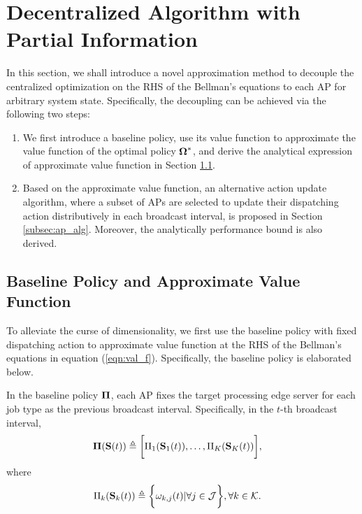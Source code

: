\section{Decentralized Algorithm with Partial Information}
\label{sec:algorithm}

In this section, we shall introduce a novel approximation method to decouple the centralized optimization on the RHS of the Bellman's equations to each AP for arbitrary system state.
Specifically, the decoupling can be achieved via the following two steps:
\begin{enumerate}
    \item We first introduce a baseline policy, use its value function to approximate the value function of the optimal policy $\boldsymbol{\Omega}^*$, and derive the analytical expression of approximate value function in Section \ref{subsec:baseline}.
    \item Based on the approximate value function, an alternative action update algorithm, where a subset of APs are selected to update their dispatching action distributively in each broadcast interval, is proposed in Section \ref{subsec:ap_alg}.
    Moreover, the analytically performance bound is also derived.
\end{enumerate}

\subsection{Baseline Policy and Approximate Value Function}
\label{subsec:baseline}
To alleviate the curse of dimensionality, we first use the baseline policy with fixed dispatching action to approximate value function at the RHS of the Bellman's equations in equation (\ref{eqn:val_f}).
Specifically, the baseline policy is elaborated below.

\begin{policy}
    In the baseline policy $\boldsymbol{\Pi}$, each AP fixes the target processing edge server for each job type as the previous broadcast interval. Specifically, in the $t$-th broadcast interval,
    \begin{align}
        \boldsymbol{\Pi}(\mathbf{S}(t)) &\triangleq \bigg[ \Pi_{1}(\mathbf{S}_{1}(t)), \dots, \Pi_{K}(\mathbf{S}_{K}(t)) \bigg],
    \end{align}
    where 
    \begin{align}
        \Pi_{k}(\mathbf{S}_{k}(t)) &\triangleq \bigg\{
            \omega_{k,j}(t) | \forall j\in\mathcal{J}
        \bigg\}, \forall k\in\mathcal{K}.
    \end{align}
\end{policy}

